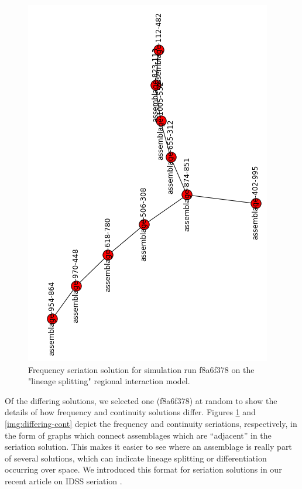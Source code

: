 \begin{figure}[ht]
\centering
\includegraphics[scale=0.4]{graphics/multipleseriation/f8a6f378-freq.png}
\caption{Frequency seriation solution for simulation run f8a6f378 on the "lineage splitting" regional interaction model.}
\label{img:differing-freq}
\end{figure}

Of the differing solutions, we selected one (f8a6f378) at random to show
the details of how frequency and continuity solutions differ. Figures
\ref{img:differing-freq} and \ref{img:differing-cont} depict the
frequency and continuity seriations, respectively, in the form of graphs
which connect assemblages which are ``adjacent'' in the seriation
solution. This makes it easier to see where an assemblage is really part
of several solutions, which can indicate lineage splitting or
differentiation occurring over space. We introduced this format for
seriation solutions in our recent article on IDSS seriation
\citep{lipomadsendunnell2015}.

